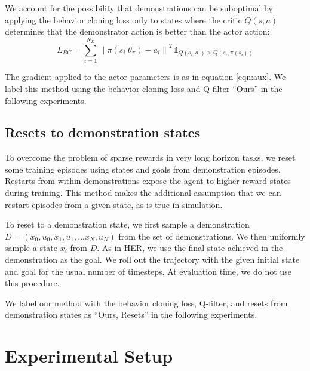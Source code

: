 \documentclass[letterpaper, 10 pt, conference]{ieeeconf}  %
\newcommand\norm[1]{\left\lVert#1\right\rVert}
\begin{document}
We account for the possibility that demonstrations can be suboptimal by applying the behavior cloning loss only to states where the critic $Q(s, a)$ determines that the demonstrator action is better than the actor action:
\begin{equation}\label{eq:filter}
    L_{BC} = \sum_{i=1}^{N_D} \norm{\pi(s_i|\theta_\pi) - a_i}^2 \, \mathds{1}_{Q(s_i, a_i) > Q(s_i, \pi(s_i))}
\end{equation}

\noindent The gradient applied to the actor parameters is as in equation \ref{eqn:aux}. We label this method using the behavior cloning loss and Q-filter ``Ours'' in the following experiments.

\subsection{Resets to demonstration states}\label{sec:reset}

To overcome the problem of sparse rewards in very long horizon tasks, we reset some training episodes using states and goals from demonstration episodes. Restarts from within demonstrations expose the agent to higher reward states during training. This method makes the additional assumption that we can restart episodes from a given state, as is true in simulation.

To reset to a demonstration state, we first sample a demonstration $D = (x_0, u_0, x_1, u_1, ... x_N, u_N)$ from the set of demonstrations. We then uniformly sample a state $x_i$ from $D$.
As in HER, we use the final state achieved in the demonstration as the goal. We roll out the trajectory with the given initial state and goal for the usual number of timesteps. At evaluation time, we do not use this procedure.

We label our method with the behavior cloning loss, Q-filter, and resets from demonstration states as ``Ours, Resets'' in the following experiments.

\section{Experimental Setup}
\end{document}
